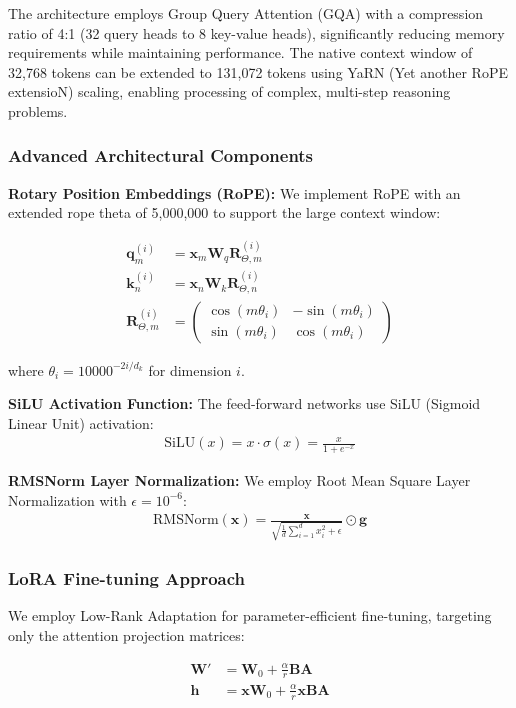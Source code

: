 The architecture employs Group Query Attention (GQA) with a compression ratio of 4:1 (32 query heads to 8 key-value heads), significantly reducing memory requirements while maintaining performance. The native context window of 32,768 tokens can be extended to 131,072 tokens using YaRN (Yet another RoPE extensioN) scaling, enabling processing of complex, multi-step reasoning problems.

\subsubsection{Advanced Architectural Components}
\textbf{Rotary Position Embeddings (RoPE):} We implement RoPE with an extended rope theta of 5,000,000 to support the large context window:

\begin{align}
\mathbf{q}_m^{(i)} &= \mathbf{x}_m \mathbf{W}_q \mathbf{R}_{\Theta,m}^{(i)} \\
\mathbf{k}_n^{(i)} &= \mathbf{x}_n \mathbf{W}_k \mathbf{R}_{\Theta,n}^{(i)} \\
\mathbf{R}_{\Theta,m}^{(i)} &= \begin{pmatrix}
\cos(m\theta_i) & -\sin(m\theta_i) \\
\sin(m\theta_i) & \cos(m\theta_i)
\end{pmatrix}
\end{align}

where $\theta_i = 10000^{-2i/d_k}$ for dimension $i$.

\textbf{SiLU Activation Function:} The feed-forward networks use SiLU (Sigmoid Linear Unit) activation:
\begin{align}
\text{SiLU}(x) = x \cdot \sigma(x) = \frac{x}{1 + e^{-x}}
\end{align}

\textbf{RMSNorm Layer Normalization:} We employ Root Mean Square Layer Normalization with $\epsilon = 10^{-6}$:
\begin{align}
\text{RMSNorm}(\mathbf{x}) = \frac{\mathbf{x}}{\sqrt{\frac{1}{d} \sum_{i=1}^{d} x_i^2 + \epsilon}} \odot \mathbf{g}
\end{align}

\subsubsection{LoRA Fine-tuning Approach}
We employ Low-Rank Adaptation for parameter-efficient fine-tuning, targeting only the attention projection matrices:

\begin{align}
\mathbf{W}' &= \mathbf{W}_0 + \frac{\alpha}{r}\mathbf{B}\mathbf{A} \\
\mathbf{h} &= \mathbf{x}\mathbf{W}_0 + \frac{\alpha}{r}\mathbf{x}\mathbf{B}\mathbf{A}
\end{align}

